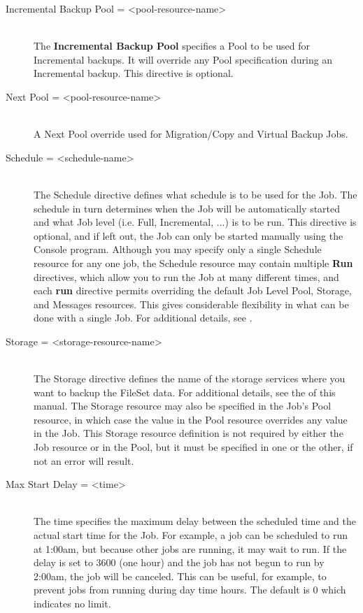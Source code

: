 \begin{description}
\item [Incremental Backup Pool = {\textless}pool-resource-name{\textgreater}] \hfill \\
The {\bf Incremental Backup Pool} specifies a Pool to be used for
Incremental backups.  It will override any Pool specification during an
Incremental backup.  This directive is optional.

\item [Next Pool = {\textless}pool-resource-name{\textgreater}] \hfill \\
A Next Pool override used for Migration/Copy and Virtual Backup Jobs.

\item [Schedule = {\textless}schedule-name{\textgreater}] \hfill \\
The Schedule directive defines what schedule is to be used for the Job.
The schedule in turn determines when the Job will be automatically
started and what Job level (i.e.  Full, Incremental, ...) is to be run.
This directive is optional, and if left out, the Job can only be started
manually using the Console program.  Although you may specify only a
single Schedule resource for any one job, the Schedule resource may
contain multiple {\bf Run} directives, which allow you to run the Job at
many different times, and each {\bf run} directive permits overriding
the default Job Level Pool, Storage, and Messages resources.  This gives
considerable flexibility in what can be done with a single Job.  For
additional details, see .

\item [Storage = {\textless}storage-resource-name{\textgreater}] \hfill \\
The Storage directive defines the name of the storage services where you
want to backup the FileSet data.  For additional details, see the
 of this manual.
The Storage resource may also be specified in the Job's Pool resource,
in which case the value in the Pool resource overrides any value
in the Job. This Storage resource definition is not required by either
the Job resource or in the Pool, but it must be specified in
one or the other, if not an error will result.

\item [Max Start Delay = {\textless}time{\textgreater}] \hfill \\
The time specifies the maximum delay between the scheduled time and the
actual start time for the Job.  For example, a job can be scheduled to
run at 1:00am, but because other jobs are running, it may wait to run.
If the delay is set to 3600 (one hour) and the job has not begun to run
by 2:00am, the job will be canceled.  This can be useful, for example,
to prevent jobs from running during day time hours.  The default is 0
which indicates no limit.


\end{description}

